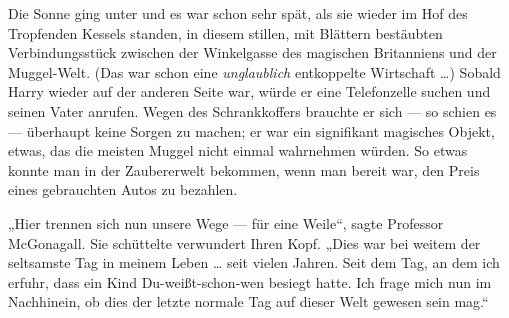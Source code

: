 Die Sonne ging unter und es war schon sehr spät, als sie wieder im Hof des Tropfenden Kessels standen, in diesem stillen, mit Blättern bestäubten Verbindungsstück zwischen der Winkelgasse des magischen Britanniens und der Muggel-Welt. (Das war schon eine \emph{unglaublich} entkoppelte Wirtschaft …) Sobald Harry wieder auf der anderen Seite war, würde er eine Telefonzelle suchen und seinen Vater anrufen. Wegen des Schrankkoffers brauchte er sich — so schien es — überhaupt keine Sorgen zu machen; er war ein signifikant magisches Objekt, etwas, das die meisten Muggel nicht einmal wahrnehmen würden. So etwas konnte man in der Zaubererwelt bekommen, wenn man bereit war, den Preis eines gebrauchten Autos zu bezahlen.

„Hier trennen sich nun unsere Wege — für eine Weile“, sagte Professor McGonagall. Sie schüttelte verwundert Ihren Kopf.
„Dies war bei weitem der seltsamste Tag in meinem Leben … seit vielen Jahren. Seit dem Tag, an dem ich erfuhr, dass ein Kind Du-weißt-schon-wen besiegt hatte. Ich frage mich nun im Nachhinein, ob dies der letzte normale Tag auf dieser Welt gewesen sein mag.“

